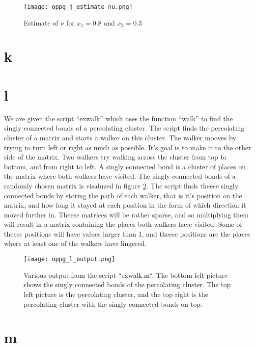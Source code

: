 \documentclass[a4paper,english, 10pt, twoside]{article}
\begin{document}
\begin{figure}[H]
 \centering
 \texttt{[image: oppg\_j\_estimate\_nu.png]}
 \caption{Estimate of $\nu$ for $x_1 = 0.8$ and $x_2 = 0.3$}
 \label{estimate_nu}
\end{figure}

\section{k}

\section{l}
We are given the script ``exwalk'' which uses the function ``walk'' to find the singly connected bonds of a percolating 
cluster. The script finds the percolating cluster of a matrix and starts a walker on this cluster. The walker mooves by 
trying to turn left or right as much as possible. It's goal is to make it to the other side of the matrix. Two walkers 
try walking across the cluster from top to bottom, and from right to left. A singly connected bond is a cluster of places 
on the matrix where both walkers have visited. The singly connected bonds of a randomly chosen matrix is visaluzed in figure 
\ref{output_exwalk}. The script finds theese singly connected bonds by storing the path of each walker, that is it's position 
on the matrix, and how long it stayed at each position in the form of which direction it moved further in. Theese matrices 
will be rather sparse, and so multiplying them will result in a matrix containing the places both walkers have visited. 
Some of theese positions will have values larger than 1, and theese positions are the places where at least one of the 
walkers have lingered.

\begin{figure}[H]
 \centering
 \texttt{[image: oppg\_l\_output.png]}
 \caption{Various output from the script ``exwalk.m``. The bottom left picture shows the singly connected bonds of the 
 percolating cluster. The top left picture is the percolating cluster, and the top right is the percolating cluster 
 with the singly connected bonds on top.}
 \label{output_exwalk}
\end{figure}

\section{m}
\end{document}

